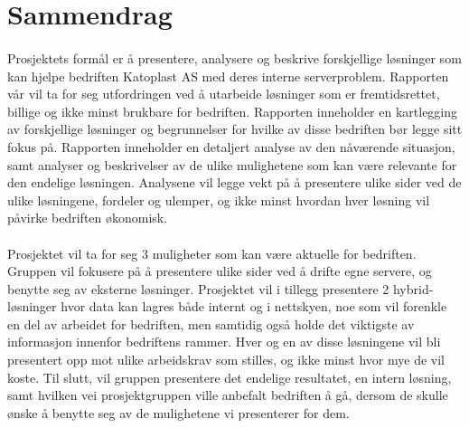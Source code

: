 \section*{Sammendrag} %
\paragraph{}Prosjektets formål er å presentere, analysere og beskrive forskjellige løsninger som kan hjelpe bedriften Katoplast AS med deres interne serverproblem. Rapporten vår vil ta for seg utfordringen ved å utarbeide løsninger som er fremtidsrettet, billige og ikke minst brukbare for bedriften. Rapporten inneholder en kartlegging av forskjellige løsninger og begrunnelser for hvilke av disse bedriften bør legge sitt fokus på. Rapporten inneholder en detaljert analyse av den nåværende situasjon, samt analyser og beskrivelser av de ulike mulighetene som kan være relevante for den endelige løsningen. Analysene vil legge vekt på å presentere ulike sider ved de ulike løsningene, fordeler og ulemper, og ikke minst hvordan hver løsning vil påvirke bedriften økonomisk. 

\paragraph{} Prosjektet vil ta for seg 3 muligheter som kan være aktuelle for bedriften. Gruppen vil fokusere på å presentere ulike sider ved å drifte egne servere, og benytte seg av eksterne løsninger. Prosjektet vil i tillegg presentere 2 hybrid-løsninger hvor data kan lagres både internt og i nettskyen, noe som vil forenkle en del av arbeidet for bedriften, men samtidig også holde det viktigste av informasjon innenfor bedriftens rammer. Hver og en av disse løsningene vil bli presentert opp mot ulike arbeidskrav som stilles, og ikke minst hvor mye de vil koste. Til slutt, vil gruppen presentere det endelige resultatet, en intern løsning, samt hvilken vei prosjektgruppen ville anbefalt bedriften å gå, dersom de skulle ønske å benytte seg av de mulighetene vi presenterer for dem. 



